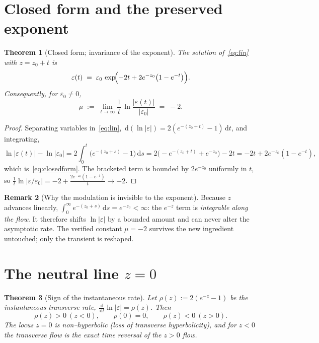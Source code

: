 \documentclass[11pt]{article}
\theoremstyle{plain}
\newtheorem{theorem}{Theorem}
\theoremstyle{definition}
\newtheorem{remark}[theorem]{Remark}
\newcommand{\eps}{\varepsilon}
\newcommand{\dd}{\,\mathrm{d}}
\begin{document}
\section{Closed form and the preserved exponent}\label{sec:exponent}

\begin{theorem}[Closed form; invariance of the exponent]\label{thm:exponent}
The solution of~\eqref{eq:lin} with $z=z_0+t$ is
\begin{equation}\label{eq:closedform}
\eps(t)\;=\;\eps_0\,\exp\!\Bigl(-2t + 2e^{-z_0}\bigl(1-e^{-t}\bigr)\Bigr).
\end{equation}
Consequently, for $\eps_0\neq0$,
\begin{equation}
\mu \;:=\; \lim_{t\to\infty}\frac1t\,\ln\frac{|\eps(t)|}{|\eps_0|}
\;=\; -2 .
\end{equation}
\end{theorem}

\begin{proof}
Separating variables in~\eqref{eq:lin},
$\dd(\ln|\eps|) = 2(e^{-(z_0+t)}-1)\dd t$, and integrating,
\[
\ln|\eps(t)|-\ln|\eps_0|
= 2\!\int_0^t\!\bigl(e^{-(z_0+s)}-1\bigr)\dd s
= 2\bigl(-e^{-(z_0+t)}+e^{-z_0}\bigr)-2t
= -2t + 2e^{-z_0}(1-e^{-t}),
\]
which is~\eqref{eq:closedform}. The bracketed term is bounded by $2e^{-z_0}$
uniformly in $t$, so
$\frac1t\ln|\eps/\eps_0| = -2 + \tfrac{2e^{-z_0}(1-e^{-t})}{t}\to-2$.
\end{proof}

\begin{remark}[Why the modulation is invisible to the exponent]
Because $z$ advances linearly, $\int_0^\infty e^{-(z_0+s)}\dd s=e^{-z_0}<\infty$:
the $e^{-z}$ term is \emph{integrable along the flow}. It therefore shifts
$\ln|\eps|$ by a bounded amount and can never alter the asymptotic rate. The
verified constant $\mu=-2$ survives the new ingredient untouched; only the
transient is reshaped.
\end{remark}

\section{The neutral line \texorpdfstring{$z=0$}{z=0}}\label{sec:neutral}

\begin{theorem}[Sign of the instantaneous rate]\label{thm:neutral}
Let $\rho(z):=2(e^{-z}-1)$ be the instantaneous transverse rate,
$\frac{\dd}{\dd t}\ln|\eps| = \rho(z)$. Then
\[
\rho(z)>0\ (z<0),\qquad \rho(0)=0,\qquad \rho(z)<0\ (z>0).
\]
The locus $z=0$ is non--hyperbolic (loss of transverse hyperbolicity), and for
$z<0$ the transverse flow is the exact time reversal of the $z>0$ flow.
\end{theorem}
\end{document}
